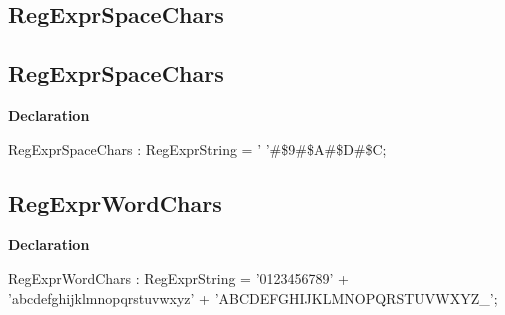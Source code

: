\documentclass{report}
\newif\ifpdf
\begin{document}
\subsection*{\large{\textbf{RegExprSpaceChars}}\normalsize\hspace{1ex}\hrulefill}
\else
\subsection*{RegExprSpaceChars}
\fi
\label{RegExpr-RegExprSpaceChars}
\begin{list}{}{
\setlength{\itemindent}{0cm}
\setlength{\listparindent}{0cm}
\setlength{\leftmargin}{\evensidemargin}
\addtolength{\leftmargin}{\tmplength}
\settowidth{\labelsep}{X}
\addtolength{\leftmargin}{\labelsep}
\setlength{\labelwidth}{\tmplength}
}
\item[\textbf{Declaration}\hfill]
\ifpdf
\begin{flushleft}
\fi
\begin{ttfamily}
RegExprSpaceChars : RegExprString =      ' '{\#}{\$}9{\#}{\$}A{\#}{\$}D{\#}{\$}C;\end{ttfamily}

\ifpdf
\end{flushleft}
\fi

\end{list}
\ifpdf
\subsection*{\large{\textbf{RegExprWordChars}}\normalsize\hspace{1ex}\hrulefill}
\else
\subsection*{RegExprWordChars}
\fi
\label{RegExpr-RegExprWordChars}
\begin{list}{}{
\setlength{\itemindent}{0cm}
\setlength{\listparindent}{0cm}
\setlength{\leftmargin}{\evensidemargin}
\addtolength{\leftmargin}{\tmplength}
\settowidth{\labelsep}{X}
\addtolength{\leftmargin}{\labelsep}
\setlength{\labelwidth}{\tmplength}
}
\item[\textbf{Declaration}\hfill]
\ifpdf
\begin{flushleft}
\fi
\begin{ttfamily}
RegExprWordChars : RegExprString =         '0123456789'   + 'abcdefghijklmnopqrstuvwxyz'
  + 'ABCDEFGHIJKLMNOPQRSTUVWXYZ{\_}';\end{ttfamily}

\ifpdf
\end{flushleft}
\fi

\end{list}
\ifpdf
\end{document}
